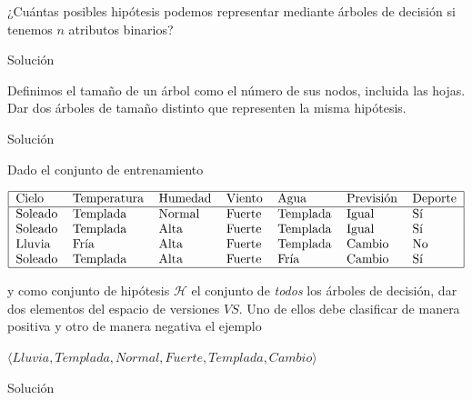 \documentclass{mulcia_aa}
\begin{document}
\genTitle
\genAdvice

\begin{question}
¿Cuántas posibles hipótesis podemos representar mediante árboles de decisión si tenemos $n$ atributos binarios?
\end{question}
\begin{solution}
Solución
\end{solution}

\begin{question}
Definimos el tamaño de un árbol como el número de sus nodos, incluida las hojas. Dar dos árboles de tamaño distinto que representen la misma hipótesis.
\end{question}
\begin{solution}
Solución
\end{solution}

\begin{question}
Dado el conjunto de entrenamiento
\vspace{-10pt}
\begin{table}[!htbp]
\begin{align*}
    \begin{tabular}{|lllllll|}
    \hline
    Cielo   & Temperatura & Humedad & Viento & Agua     & Previsión & Deporte \\ \hline
    Soleado & Templada    & Normal  & Fuerte & Templada & Igual     & Sí      \\
    Soleado & Templada    & Alta    & Fuerte & Templada & Igual     & Sí      \\
    Lluvia  & Fría        & Alta    & Fuerte & Templada & Cambio    & No      \\
    Soleado & Templada    & Alta    & Fuerte & Fría     & Cambio    & Sí      \\ \hline
    \end{tabular}
\end{align*}
\end{table}
\vspace{-20pt}
\begin{flushleft}
y como conjunto de hipótesis $\mathcal{H}$ el conjunto de \emph{todos} los árboles de decisión, dar dos elementos del espacio de versiones $VS$. Uno de ellos debe clasificar de manera positiva y otro de manera negativa el ejemplo
\end{flushleft}

\centering$\langle Lluvia, Templada, Normal, Fuerte, Templada, Cambio \rangle$
\end{question}
\begin{solution}
Solución
\end{solution}
 
\end{document}
